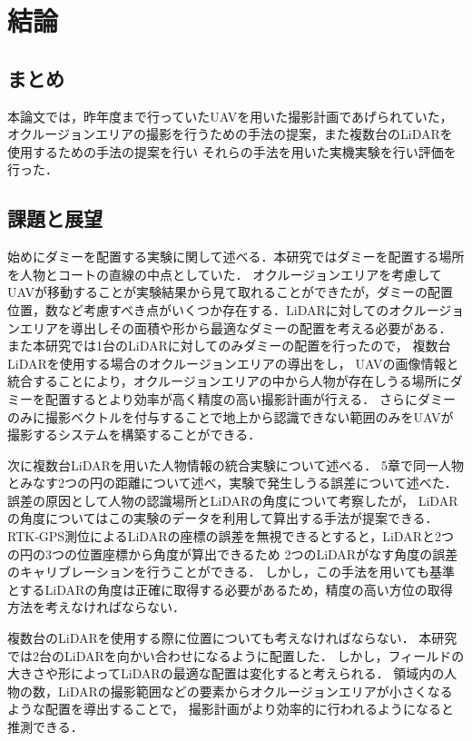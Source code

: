 \documentclass[autodetect-engine,dvipdfmx-if-dvi,ja=standard,a4j,jbase=11pt,magstyle=nomag*]{bxjsreport}
\begin{document}
\chapter{結論}

\section{まとめ}
本論文では，昨年度まで行っていたUAVを用いた撮影計画であげられていた，
オクルージョンエリアの撮影を行うための手法の提案，また複数台のLiDARを使用するための手法の提案を行い
それらの手法を用いた実機実験を行い評価を行った．

\section{課題と展望}
始めにダミーを配置する実験に関して述べる．本研究ではダミーを配置する場所を人物とコートの直線の中点としていた．
オクルージョンエリアを考慮してUAVが移動することが実験結果から見て取れることができたが，ダミーの配置位置，数など考慮すべき点がいくつか存在する．LiDARに対してのオクルージョンエリアを導出しその面積や形から最適なダミーの配置を考える必要がある．
また本研究では1台のLiDARに対してのみダミーの配置を行ったので，
複数台LiDARを使用する場合のオクルージョンエリアの導出をし，
UAVの画像情報と統合することにより，オクルージョンエリアの中から人物が存在しうる場所にダミーを配置するとより効率が高く精度の高い撮影計画が行える．
さらにダミーのみに撮影ベクトルを付与することで地上から認識できない範囲のみをUAVが撮影するシステムを構築することができる．

次に複数台LiDARを用いた人物情報の統合実験について述べる．
5章で同一人物とみなす2つの円の距離について述べ，実験で発生しうる誤差について述べた．
誤差の原因として人物の認識場所とLiDARの角度について考察したが，
LiDARの角度についてはこの実験のデータを利用して算出する手法が提案できる．
RTK‐GPS測位によるLiDARの座標の誤差を無視できるとすると，LiDARと2つの円の3つの位置座標から角度が算出できるため
2つのLiDARがなす角度の誤差のキャリブレーションを行うことができる．
しかし，この手法を用いても基準とするLiDARの角度は正確に取得する必要があるため，精度の高い方位の取得方法を考えなければならない．

複数台のLiDARを使用する際に位置についても考えなければならない．
本研究では2台のLiDARを向かい合わせになるように配置した．
しかし，フィールドの大きさや形によってLiDARの最適な配置は変化すると考えられる．
領域内の人物の数，LiDARの撮影範囲などの要素からオクルージョンエリアが小さくなるような配置を導出することで，
撮影計画がより効率的に行われるようになると推測できる．
\end{document}
